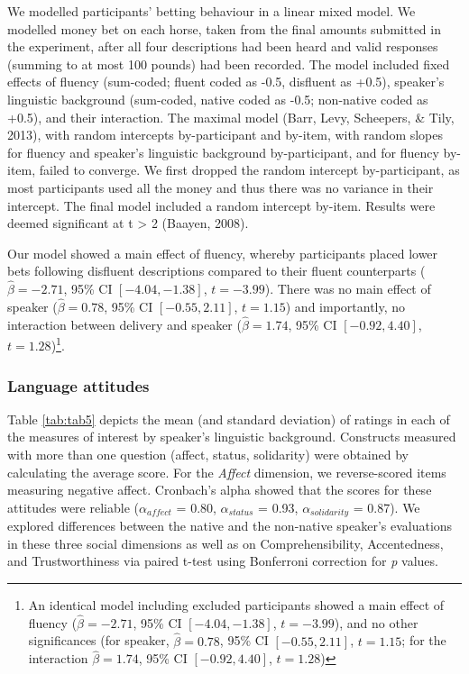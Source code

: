 \documentclass[
  man,floatsintext]{apa6}
\begin{document}
We modelled participants' betting behaviour in a linear mixed model. We modelled money bet on each horse, taken from the final amounts submitted in the experiment, after all four descriptions had been heard and valid responses (summing to at most 100 pounds) had been recorded. The model included fixed effects of fluency (sum-coded; fluent coded as -0.5, disfluent as +0.5), speaker's linguistic background (sum-coded, native coded as -0.5; non-native coded as +0.5), and their interaction. The maximal model (Barr, Levy, Scheepers, \& Tily, 2013), with random intercepts by-participant and by-item, with random slopes for fluency and speaker's linguistic background by-participant, and for fluency by-item, failed to converge. We first dropped the random intercept by-participant, as most participants used all the money and thus there was no variance in their intercept. The final model included a random intercept by-item. Results were deemed significant at \textbar t\textbar{} \textgreater{} 2 (Baayen, 2008).

Our model showed a main effect of fluency, whereby participants placed lower bets following disfluent descriptions compared to their fluent counterparts (\(\hat{\beta} = -2.71\), 95\% CI \([-4.04, -1.38]\), \(t = -3.99\)). There was no main effect of speaker (\(\hat{\beta} = 0.78\), 95\% CI \([-0.55, 2.11]\), \(t = 1.15\)) and importantly, no interaction between delivery and speaker (\(\hat{\beta} = 1.74\), 95\% CI \([-0.92, 4.40]\), \(t = 1.28\))\footnote{An identical model including excluded participants showed a main effect of fluency (\(\hat{\beta} = -2.71\), 95\% CI \([-4.04, -1.38]\), \(t = -3.99\)), and no other significances (for speaker, \(\hat{\beta} = 0.78\), 95\% CI \([-0.55, 2.11]\), \(t = 1.15\); for the interaction \(\hat{\beta} = 1.74\), 95\% CI \([-0.92, 4.40]\), \(t = 1.28\))}.

\hypertarget{language-attitudes}{%
\subsubsection{Language attitudes}\label{language-attitudes}}

Table \ref{tab:tab5} depicts the mean (and standard deviation) of ratings in each of the measures of interest by speaker's linguistic background. Constructs measured with more than one question (affect, status, solidarity) were obtained by calculating the average score. For the \emph{Affect} dimension, we reverse-scored items measuring negative affect. Cronbach's alpha showed that the scores for these attitudes were reliable (\(\alpha_{affect}\) = 0.80, \(\alpha_{status}\) = 0.93, \(\alpha_{solidarity}\) = 0.87). We explored differences between the native and the non-native speaker's evaluations in these three social dimensions as well as on Comprehensibility, Accentedness, and Trustworthiness via paired t-test using Bonferroni correction for \emph{p} values.
\end{document}
